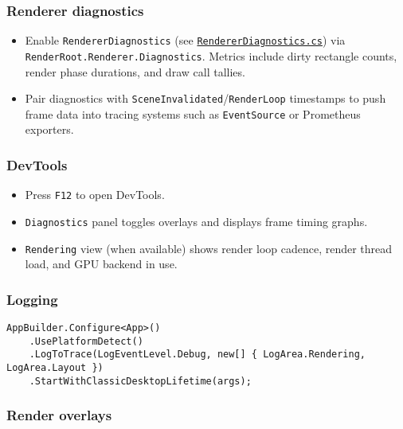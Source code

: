 \subsubsection{Renderer diagnostics}\label{renderer-diagnostics}

\begin{itemize}
\tightlist
\item
  Enable \passthrough{\lstinline!RendererDiagnostics!} (see
  \href{https://github.com/AvaloniaUI/Avalonia/blob/master/src/Avalonia.Base/Rendering/RendererDiagnostics.cs}{\passthrough{\lstinline!RendererDiagnostics.cs!}})
  via \passthrough{\lstinline!RenderRoot.Renderer.Diagnostics!}. Metrics
  include dirty rectangle counts, render phase durations, and draw call
  tallies.
\item
  Pair diagnostics with
  \passthrough{\lstinline!SceneInvalidated!}/\passthrough{\lstinline!RenderLoop!}
  timestamps to push frame data into tracing systems such as
  \passthrough{\lstinline!EventSource!} or Prometheus exporters.
\end{itemize}

\subsubsection{DevTools}\label{devtools}

\begin{itemize}
\tightlist
\item
  Press \passthrough{\lstinline!F12!} to open DevTools.
\item
  \passthrough{\lstinline!Diagnostics!} panel toggles overlays and
  displays frame timing graphs.
\item
  \passthrough{\lstinline!Rendering!} view (when available) shows render
  loop cadence, render thread load, and GPU backend in use.
\end{itemize}

\subsubsection{Logging}\label{logging}

\begin{lstlisting}
AppBuilder.Configure<App>()
    .UsePlatformDetect()
    .LogToTrace(LogEventLevel.Debug, new[] { LogArea.Rendering, LogArea.Layout })
    .StartWithClassicDesktopLifetime(args);
\end{lstlisting}

\subsubsection{Render overlays}\label{render-overlays}

